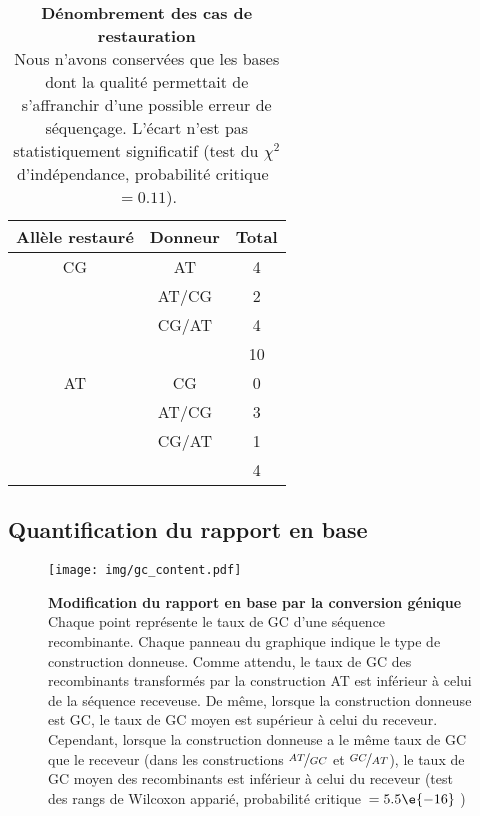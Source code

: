 \lipsum[1]

\begin{table}[htbp]
  \centering
  \rmfamily
  \begin{tabular}{ccc}
    \toprule
    Allèle restauré & Donneur & Total                    \\
    \midrule
    CG              & AT      & 4                        \\
                    & AT/CG   & 2                        \\
                    & CG/AT   & 4                        \\
                    &         & \cellcolor{LightGray} 10 \\
    \midrule[0.1pt]
    AT              & CG      & 0                        \\
                    & AT/CG   & 3                        \\
                    & CG/AT   & 1                        \\
                    &         & \cellcolor{LightGray} 4  \\
    \bottomrule
  \end{tabular}
  \caption[Dénombrement des cas de restauration]{\textbf{Dénombrement des cas de
      restauration} \\
    \rmfamily Nous n'avons conservées que les bases dont la qualité permettait de
    s'affranchir d'une possible erreur de séquençage. L'écart n'est pas
    statistiquement significatif (test du \(\chi^2\) d'indépendance, probabilité
    critique~\(= 0.11\)).
  }
  \label{tab:restaur}
\end{table}

\subsection{Quantification du rapport en base}
\label{subsec:tauxgc}

\begin{figure}[ht]
  \texttt{[image: img/gc\_content.pdf]}

  \caption[Modification du rapport en base ?]{\textbf{Modification du rapport en base par la
      conversion génique} \\
    \rmfamily Chaque point représente le taux de GC d'une séquence recombinante.
    Chaque panneau du graphique indique le type de construction donneuse. Comme
    attendu, le taux de GC des recombinants transformés par la construction AT
    est inférieur à celui de la séquence receveuse. De même, lorsque la
    construction donneuse est GC, le taux de GC moyen est supérieur à celui du
    receveur. Cependant, lorsque la construction donneuse a le même taux de GC
    que le receveur (dans les constructions $\nicefrac{AT}{GC}$ et
    $\nicefrac{GC}{AT}$), le taux de GC moyen des recombinants est inférieur à
    celui du receveur (test des rangs de Wilcoxon apparié, probabilité
    critique~\(= 5.5\e{-16}\) ) }\label{fig:tauxgc}

\end{figure}
